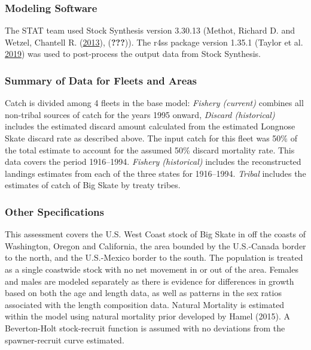 \documentclass[12pt,]{article}
\begin{document}
\hypertarget{modeling-software}{%
\subsubsection{Modeling Software}\label{modeling-software}}

The STAT team used Stock Synthesis version 3.30.13 (Methot, Richard D.
and Wetzel, Chantell R. (\protect\hyperlink{ref-Methot2013}{2013}),
({\textbf{???}})). The r4ss package version 1.35.1 (Taylor et al.
\protect\hyperlink{ref-Taylor2019}{2019}) was used to post-process the
output data from Stock Synthesis.

\hypertarget{summary-of-data-for-fleets-and-areas}{%
\subsubsection{Summary of Data for Fleets and
Areas}\label{summary-of-data-for-fleets-and-areas}}

Catch is divided among 4 fleets in the base model: \emph{Fishery
(current)} combines all non-tribal sources of catch for the years 1995
onward, \emph{Discard (historical)} includes the estimated discard
amount calculated from the estimated Longnose Skate discard rate as
described above. The input catch for this fleet was 50\% of the total
estimate to account for the assumed 50\% discard mortality rate. This
data covers the period 1916--1994. \emph{Fishery (historical)} includes
the reconstructed landings estimates from each of the three states for
1916--1994. \emph{Tribal} includes the estimates of catch of Big Skate
by treaty tribes.

\hypertarget{other-specifications}{%
\subsubsection{Other Specifications}\label{other-specifications}}

This assessment covers the U.S. West Coast stock of Big Skate in off the
coasts of Washington, Oregon and California, the area bounded by the
U.S.-Canada border to the north, and the U.S.-Mexico border to the
south. The population is treated as a single coastwide stock with no net
movement in or out of the area. Females and males are modeled separately
as there is evidence for differences in growth based on both the age and
length data, as well as patterns in the sex ratios associated with the
length composition data. Natural Mortality is estimated within the model
using natural mortality prior developed by Hamel (2015). A Beverton-Holt
stock-recruit function is assumed with no deviations from the
spawner-recruit curve estimated.
\end{document}
